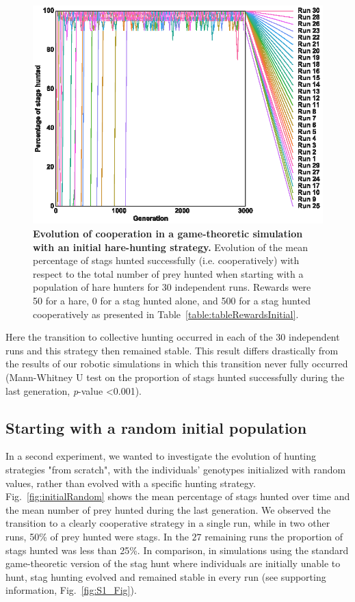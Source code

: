     \begin{figure}[h]
      \centering
          \includegraphics[scale = 1.0]{fig/ArticleBio1/Fig4.eps}
      \caption{\textbf{Evolution of cooperation in a game-theoretic simulation with an initial hare-hunting strategy.} 
      Evolution of the mean percentage of stags hunted successfully (i.e. cooperatively) with respect to the total number of prey hunted when starting with a population of hare hunters for 30 independent runs. Rewards were 50 for a hare, 0 for a stag hunted alone, and 500 for a stag hunted cooperatively as presented in Table~\ref{table:tableRewardsInitial}.}
      \label{fig:hareHuntersTheo}
    \end{figure}

    Here the transition to collective hunting occurred in each of the 30 independent runs and this strategy then remained stable. This result differs drastically from the results of our robotic simulations in which this transition never fully occurred (Mann-Whitney U test on the proportion of stags hunted successfully during the last generation, {\em p}-value \textless 0.001).


  \subsection{Starting with a random initial population}
    In a second experiment, we wanted to investigate the evolution of hunting strategies "from scratch", with the individuals' genotypes initialized with random values, rather than evolved with a specific hunting strategy. Fig.~\ref{fig:initialRandom} shows the mean percentage of stags hunted over time and the mean number of prey hunted during the last generation. We observed the transition to a clearly cooperative strategy in a single run, while in two other runs, 50\% of prey hunted were stags. In the $27$ remaining runs the proportion of stags hunted was less than 25\%. In comparison, in simulations using the standard game-theoretic version of the stag hunt where individuals are initially unable to hunt, stag hunting evolved and remained stable in every run (see supporting information, Fig.~\ref{fig:S1_Fig}).

